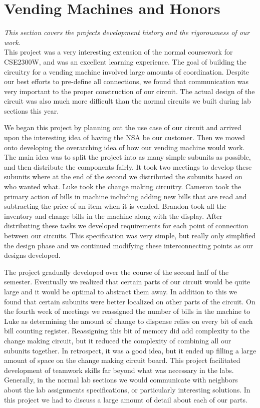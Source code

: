 \section{Vending Machines and Honors}
\emph{This section covers the projects development history and the rigorousness of our work.}\\  


This project was a very interesting extension of the normal coursework
for CSE2300W, and was an excellent learning experience. The goal of 
building the circuitry for a vending machine involved large amounts of 
coordination. Despite our best efforts to pre-define all connections, we
found that communication was very important to the proper construction
of our circuit. The actual design of the circuit was also much more 
difficult than the normal circuits we built during lab sections this year.


We began this project by planning out the use case of our circuit and
arrived upon the interesting idea of having the NSA be our customer. Then 
we moved onto developing the overarching idea of how our vending machine 
would work. The main idea was to split the project into as many simple 
subunits as possible, and then distribute the components fairly. It took 
two meetings to develop these subunits where at the end of the second we 
distributed the subunits based on who wanted what. Luke took the change 
making circuitry. Cameron took the primary action of bills in machine 
including adding new bills that are read and subtracting the price of an 
item when it is vended. Brandon took all the inventory and change bills 
in the machine along with the display. After distributing these tasks we 
developed requirements for each point of connection between our circuits. 
This specification was very simple, but really only simplified the design 
phase and we continued modifying these interconnecting points as our 
designs developed.


The project gradually developed over the course of the second half of the 
semester. Eventually we realized that certain parts of our circuit would 
be quite large and it would be optimal to abstract them away. In addition 
to this we found that certain subunits were better localized on other 
parts of the circuit. On the fourth week of meetings we reassigned the 
number of bills in the machine to Luke as determining the amount of 
change to dispense relies on every bit of each bill counting register. 
Reassigning this bit of memory did add complexity to the change making 
circuit, but it reduced the complexity of combining all our subunits 
together. In retrospect, it was a good idea, but it ended up filling 
a large amount of space on the change making circuit board. This project 
facilitated development of teamwork skills far beyond what was necessary 
in the labs. Generally, in the normal lab sections we would communicate 
with neighbors about the lab assignments specifications, or particularly 
interesting solutions. In this project we had to discuss a large amount of
detail about each of our parts.


